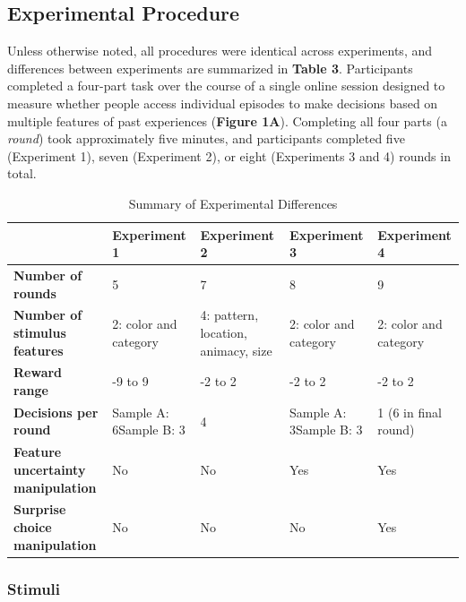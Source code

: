 \documentclass[10pt,letterpaper]{article}
\begin{document}
\subsection{Experimental Procedure}

Unless otherwise noted, all procedures were identical across experiments, and differences between experiments are summarized in \textbf{Table 3}. Participants completed a four-part task over the course of a single online session designed to measure whether people access individual episodes to make decisions based on multiple features of past experiences (\textbf{Figure 1A}). Completing all four parts (a \textit{round}) took approximately five minutes, and participants completed five (Experiment 1), seven (Experiment 2), or eight (Experiments 3 and 4) rounds in total.

\begin{table}[h]
\centering
\begin{tabular}{p{3cm}p{2.5cm}p{2.5cm}p{2.5cm}p{2.5cm}}
\hline
 & \textbf{Experiment 1} & \textbf{Experiment 2} & \textbf{Experiment 3} & \textbf{Experiment 4} \\
\hline
\textbf{Number of rounds} & 5 & 7 & 8 & 9 \\
\hline
\textbf{Number of stimulus features} & 2: color and category & 4: pattern, location, animacy, size & 2: color and category & 2: color and category \\
\hline
\textbf{Reward range} & -9 to 9 & -2 to 2 & -2 to 2 & -2 to 2 \\
\hline
\textbf{Decisions per round} & Sample A: 6\newline Sample B: 3 & 4 & Sample A: 3\newline Sample B: 3 & 1 (6 in final round) \\
\hline
\textbf{Feature uncertainty manipulation }& No & No & Yes & Yes \\
\hline
\textbf{Surprise choice manipulation} & No & No & No & Yes \\
\hline
\end{tabular}
\caption{Summary of Experimental Differences}
\label{tab:exp_differences}
\end{table}

\subsubsection{Stimuli}
\end{document}
